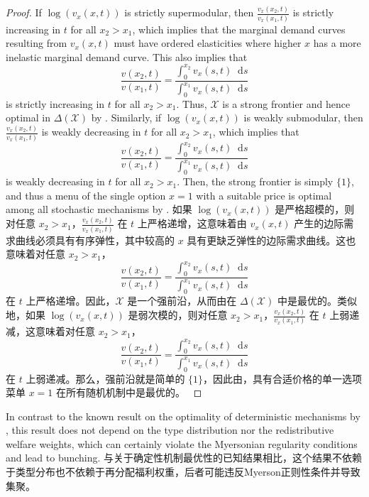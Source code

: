 \documentclass[12pt,letterpaper]{article}
\newenvironment{original}{\color{black}\noindent}{}
\newenvironment{translation}{\color{blue}\noindent}{}
\theoremstyle{plain}
\theoremstyle{definition}
\theoremstyle{remark}
\renewcommand{\1}{\mathds{1}}
\renewcommand*\d{\mathop{}\!\mathrm{d}}
\newcommand{\X}{\mathcal{X}}
\theoremstyle{definition}
\begin{document}
\begin{proof}
\begin{original}
If $\log(v_x(x,t))$ is strictly supermodular, then
$\frac{v_x(x_2, t)}{v_x(x_1, t)}$
is strictly increasing in $t$ for all $x_2 > x_1$, which implies that the marginal demand curves resulting from $v_x(x, t)$ must have ordered elasticities where higher $x$ has a more inelastic marginal demand curve. This also implies that
\[ \frac{v(x_2, t)}{v(x_1, t)}= \frac{\int_{0}^{x_2}v_x(s, t) \d s}{\int_{0}^{x_1}v_x(s, t) \d s}\]
is strictly increasing in $t$ for all $x_2 > x_1$. Thus, $\X$ is a strong frontier and hence optimal in $\Delta(\X)$ by . Similarly, if $\log(v_x(x,t))$ is weakly submodular, then $\frac{v_x(x_2, t)}{v_x(x_1, t)}$
is weakly decreasing in $t$ for all $x_2 > x_1$, which implies that
\[ \frac{v(x_2, t)}{v(x_1, t)}= \frac{\int_{0}^{x_2}v_x(s, t) \d s}{\int_{0}^{x_1}v_x(s, t) \d s}\]
is weakly decreasing in $t$ for all $x_2 > x_1$. Then, the strong frontier is simply $\{1\}$, and thus a menu of the single option $x = 1$ with a suitable price is optimal among all stochastic mechanisms by .
\end{original}
\begin{translation}
如果 $\log(v_x(x,t))$ 是严格超模的，则对任意 $x_2 > x_1$，$\frac{v_x(x_2, t)}{v_x(x_1, t)}$ 在 $t$ 上严格递增，这意味着由 $v_x(x, t)$ 产生的边际需求曲线必须具有有序弹性，其中较高的 $x$ 具有更缺乏弹性的边际需求曲线。这也意味着对任意 $x_2 > x_1$，
\[ \frac{v(x_2, t)}{v(x_1, t)}= \frac{\int_{0}^{x_2}v_x(s, t) \d s}{\int_{0}^{x_1}v_x(s, t) \d s}\]
在 $t$ 上严格递增。因此，$\X$ 是一个强前沿，从而由在 $\Delta(\X)$ 中是最优的。类似地，如果 $\log(v_x(x,t))$ 是弱次模的，则对任意 $x_2 > x_1$，$\frac{v_x(x_2, t)}{v_x(x_1, t)}$ 在 $t$ 上弱递减，这意味着对任意 $x_2 > x_1$，
\[ \frac{v(x_2, t)}{v(x_1, t)}= \frac{\int_{0}^{x_2}v_x(s, t) \d s}{\int_{0}^{x_1}v_x(s, t) \d s}\]
在 $t$ 上弱递减。那么，强前沿就是简单的 $\{1\}$，因此由，具有合适价格的单一选项菜单 $x = 1$ 在所有随机机制中是最优的。
\end{translation}
\end{proof}

\begin{original}
In contrast to the known result on the optimality of deterministic mechanisms by \citet{strausz2003deterministic}, this result does not depend on the type distribution nor the redistributive welfare weights, which can certainly violate the Myersonian regularity conditions and lead to bunching.
\end{original}
\begin{translation}
与\citet{strausz2003deterministic}关于确定性机制最优性的已知结果相比，这个结果不依赖于类型分布也不依赖于再分配福利权重，后者可能违反Myerson正则性条件并导致集聚。
\end{translation}
\end{document}
